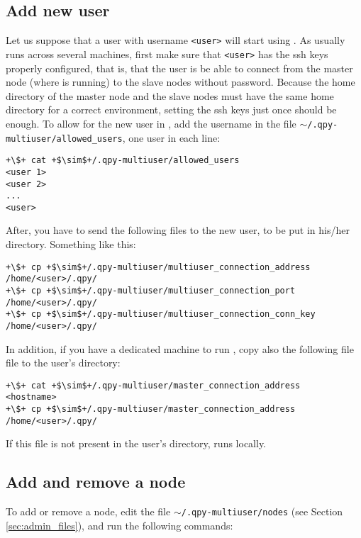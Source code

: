 \documentclass[a4paper,12pt]{article}
\begin{document}
\subsection{Add new user}

Let us suppose that a user with username \texttt{<user>} will start using \qpy{}.
As \qpy{} usually runs across several machines, first make sure that \texttt{<user>} has the ssh keys properly configured, that is, that the user is be able to connect from the master node (where \qpy{} is running) to the slave nodes without password.
Because the home directory of the master node and the slave nodes must have the same home directory for a correct \qpy{} environment, setting the ssh keys just once should be enough.
To allow for the new user in \qpy{}, add the username in the file \texttt{$\sim$/.qpy-multiuser/allowed\_users}, one user in each line:

\begin{lstlisting}[style=BashStyle]
+\$+ cat +$\sim$+/.qpy-multiuser/allowed_users
<user 1>
<user 2>
...
<user>
\end{lstlisting}

After, you have to send the following files to the new user, to be put in his/her \qpy{} directory.
Something like this:

\begin{lstlisting}[style=BashStyle]
+\$+ cp +$\sim$+/.qpy-multiuser/multiuser_connection_address /home/<user>/.qpy/
+\$+ cp +$\sim$+/.qpy-multiuser/multiuser_connection_port /home/<user>/.qpy/
+\$+ cp +$\sim$+/.qpy-multiuser/multiuser_connection_conn_key /home/<user>/.qpy/
\end{lstlisting}

In addition, if you have a dedicated machine to run \qpy{}, copy also the following file file to the user's \qpy{} directory:

\begin{lstlisting}[style=BashStyle]
+\$+ cat +$\sim$+/.qpy-multiuser/master_connection_address
<hostname>
+\$+ cp +$\sim$+/.qpy-multiuser/master_connection_address /home/<user>/.qpy/
\end{lstlisting}

If this file is not present in the user's \qpy{} directory, \qpy{} runs locally.

\subsection{Add and remove a node}

To add or remove a node, edit the file \texttt{$\sim$/.qpy-multiuser/nodes} (see Section \ref{sec:admin_files}), and run the following commands:
\end{document}

